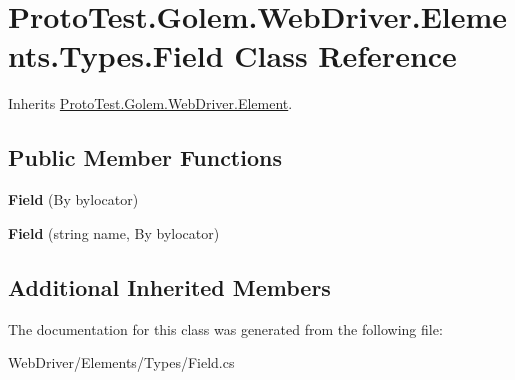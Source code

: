 \hypertarget{class_proto_test_1_1_golem_1_1_web_driver_1_1_elements_1_1_types_1_1_field}{\section{Proto\-Test.\-Golem.\-Web\-Driver.\-Elements.\-Types.\-Field Class Reference}
\label{class_proto_test_1_1_golem_1_1_web_driver_1_1_elements_1_1_types_1_1_field}
}


Inherits \hyperlink{class_proto_test_1_1_golem_1_1_web_driver_1_1_element}{Proto\-Test.\-Golem.\-Web\-Driver.\-Element}.

\subsection*{Public Member Functions}
\begin{DoxyCompactItemize}
\item 
\hypertarget{class_proto_test_1_1_golem_1_1_web_driver_1_1_elements_1_1_types_1_1_field_a18f0f354ba97cc65eed812c9c885642b}{{\bfseries Field} (By bylocator)}\label{class_proto_test_1_1_golem_1_1_web_driver_1_1_elements_1_1_types_1_1_field_a18f0f354ba97cc65eed812c9c885642b}

\item 
\hypertarget{class_proto_test_1_1_golem_1_1_web_driver_1_1_elements_1_1_types_1_1_field_ab99f3803bd5750a527438615eec2e81e}{{\bfseries Field} (string name, By bylocator)}\label{class_proto_test_1_1_golem_1_1_web_driver_1_1_elements_1_1_types_1_1_field_ab99f3803bd5750a527438615eec2e81e}

\end{DoxyCompactItemize}
\subsection*{Additional Inherited Members}


The documentation for this class was generated from the following file\-:\begin{DoxyCompactItemize}
\item 
Web\-Driver/\-Elements/\-Types/Field.\-cs\end{DoxyCompactItemize}
